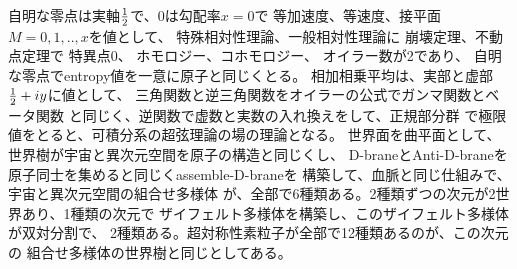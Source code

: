 \documentclass{jsarticle}
\begin{document}
\title{}
\author{}
\date{}
\maketitle

  自明な零点は実軸${1 \over 2} $で、0は勾配率$x=0$で
  等加速度、等速度、接平面$M=0,1,..,x$を値として、
  特殊相対性理論、一般相対性理論に 崩壊定理、不動点定理で 特異点0、
  ホモロジー、コホモロジー、  オイラー数が2であり、
  自明な零点でentropy値を一意に原子と同じくとる。
  相加相乗平均は、実部と虚部${{1 \over 2}+iy}$に値として、
  三角関数と逆三角関数をオイラーの公式でガンマ関数とベータ関数
  と同じく、逆関数で虚数と実数の入れ換えをして、正規部分群
  で極限値をとると、可積分系の超弦理論の場の理論となる。
  世界面を曲平面として、世界樹が宇宙と異次元空間を原子の構造と同じくし、
  D-braneとAnti-D-braneを原子同士を集めると同じくassemble-D-braneを
  構築して、血脈と同じ仕組みで、宇宙と異次元空間の組合せ多様体
  が、全部で6種類ある。2種類ずつの次元が2世界あり、1種類の次元で
  ザイフェルト多様体を構築し、このザイフェルト多様体が双対分割で、
  2種類ある。超対称性素粒子が全部で12種類あるのが、この次元の
  組合せ多様体の世界樹と同じとしてある。
\end{document}
